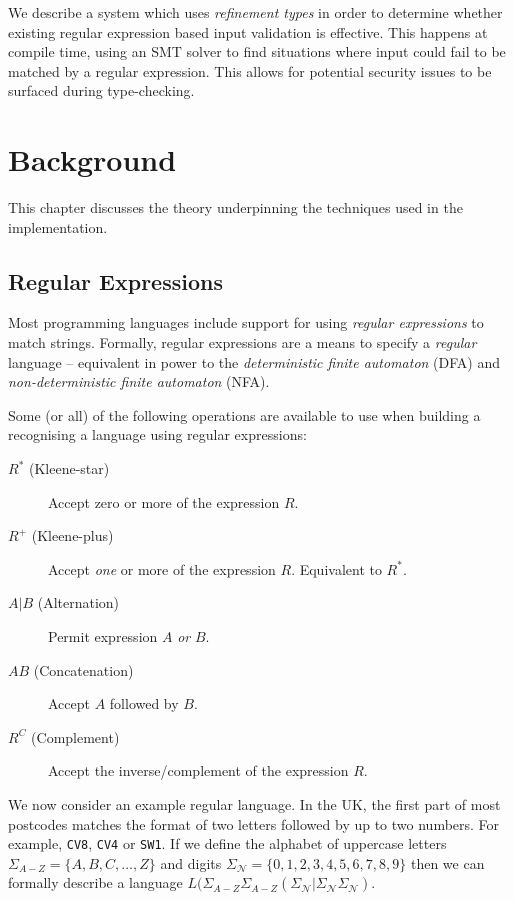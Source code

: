 \documentclass[a4paper,openany,12pt]{book}
\begin{document}
We describe a system which uses \emph{refinement types} in order to determine whether existing regular expression based input validation is effective. This happens at compile time, using an SMT solver to find situations where input could fail to be matched by a regular expression. This allows for potential security issues to be surfaced during type-checking.

\chapter{Background}
This chapter discusses the theory underpinning the techniques used in the implementation.


\section{Regular Expressions}

Most programming languages include support for using \emph{regular expressions} to match strings. Formally, regular expressions are a means to specify a \emph{regular} language -- equivalent in power to the \emph{deterministic finite automaton} (DFA) and \emph{non-deterministic finite automaton} (NFA).



Some (or all) of the following operations are available to use when building a recognising a language using regular expressions:

\begin{description}
	\item[$R^*$ (Kleene-star)] Accept zero or more of the expression $R$.
	\item[$R^+$ (Kleene-plus)] Accept \emph{one} or more of the expression $R$. Equivalent to ${R^*}$.
	\item[$A \vert{} B$ (Alternation)] Permit expression $A$ \emph{or} $B$.
	\item[$AB$ (Concatenation)] Accept $A$ followed by $B$.
	\item[$R^C$ (Complement)] Accept the inverse/complement of the expression $R$.
\end{description}


We now consider an example regular language. In the UK, the first part of most postcodes matches the format of two letters followed by up to two numbers. For example, \texttt{CV8}, \texttt{CV4} or \texttt{SW1}. If we define the alphabet of uppercase letters $\Sigma_{A-Z} = \{A, B, C, \ldots, Z\}$ and digits $\Sigma_\mathcal{N} = \{0,1,2,3,4,5,6,7,8,9\}$ then we can formally describe a language $L(\Sigma_{A-Z} \Sigma_{A-Z}(\Sigma_\mathcal{N} | \Sigma_\mathcal{N} \Sigma_\mathcal{N})$.
\end{document}
